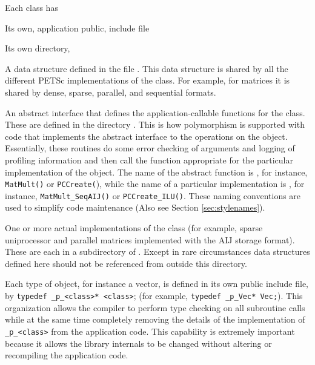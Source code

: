 Each class has
\begin{tightitemize}
\item Its own, application public, include file 
\item Its own directory, 
\item A data structure defined in  the file
      .
      This data structure is shared by all the different PETSc implementations of the
      class. For example, for matrices it is shared by dense,
      sparse, parallel, and sequential formats.
\item An abstract interface that defines the application-callable
      functions for the class. These are defined in the directory
      . This is how polymorphism is supported with code that implements the abstract interface to the
operations on the object.  Essentially, these routines do some error
checking of arguments and logging of profiling information
and then call the function appropriate for the
particular implementation of the object. The name of the abstract
    function is , for instance, \lstinline{MatMult()} or \lstinline{PCCreate(}), while
the name of a particular implementation is
, for instance,
\lstinline{MatMult_SeqAIJ()} or \lstinline{PCCreate_ILU()}. These naming
    conventions are used to simplify code maintenance (Also see Section \ref{sec:stylenames}).

\item One or more actual implementations of the class (for example,
      sparse uniprocessor and parallel matrices implemented with the AIJ storage format).
      These are each in a subdirectory of
      . Except in rare circumstances data
      structures defined here should not be referenced from outside this
      directory.
\end{tightitemize}

Each type of object, for instance a vector, is defined in its own
public include file, by \lstinline{typedef _p_<class>* <class>}; (for example, \lstinline{typedef _p_Vec* Vec;}).
  This organization allows the compiler to perform type checking on all subroutine calls
while at the same time
completely removing the details of the implementation of \lstinline{_p_<class>} from the application code.  This capability is extremely important
because it allows the library internals to be changed
without altering or recompiling the application code.


